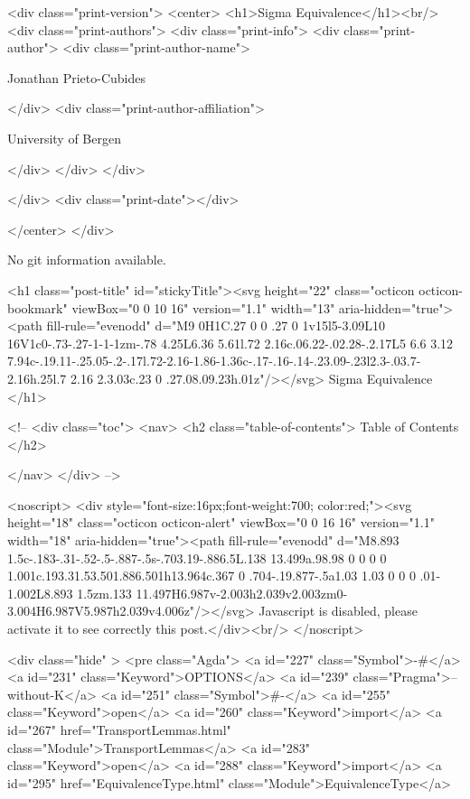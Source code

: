   <div class="print-version">
    <center>
      <h1>Sigma Equivalence</h1><br/>
        <div class="print-authors">
          <div class="print-info">
            <div class="print-author">
              <div class="print-author-name">
                
                  Jonathan Prieto-Cubides
                
              </div>
              <div class="print-author-affiliation">
                
                  University of Bergen
                
                </div>
            </div>
          </div>
          
          
        </div>
        <div class="print-date"></div>
        
        
    </center>
  </div>

  
  No git information available.
  
  <h1 class="post-title" id="stickyTitle"><svg height="22" class="octicon octicon-bookmark" viewBox="0 0 10 16" version="1.1" width="13" aria-hidden="true"><path fill-rule="evenodd" d="M9 0H1C.27 0 0 .27 0 1v15l5-3.09L10 16V1c0-.73-.27-1-1-1zm-.78 4.25L6.36 5.61l.72 2.16c.06.22-.02.28-.2.17L5 6.6 3.12 7.94c-.19.11-.25.05-.2-.17l.72-2.16-1.86-1.36c-.17-.16-.14-.23.09-.23l2.3-.03.7-2.16h.25l.7 2.16 2.3.03c.23 0 .27.08.09.23h.01z"/></svg> Sigma Equivalence
  </h1>

  <!-- 
  <div class="toc">
    <nav>
    <h2 class="table-of-contents"> Table of Contents </h2>
      

    </nav>
  </div>
   -->

  <noscript>
  <div style="font-size:16px;font-weight:700; color:red;"><svg height="18" class="octicon octicon-alert" viewBox="0 0 16 16" version="1.1" width="18" aria-hidden="true"><path fill-rule="evenodd" d="M8.893 1.5c-.183-.31-.52-.5-.887-.5s-.703.19-.886.5L.138 13.499a.98.98 0 0 0 0 1.001c.193.31.53.501.886.501h13.964c.367 0 .704-.19.877-.5a1.03 1.03 0 0 0 .01-1.002L8.893 1.5zm.133 11.497H6.987v-2.003h2.039v2.003zm0-3.004H6.987V5.987h2.039v4.006z"/></svg> Javascript is disabled, please activate it to see correctly this post.</div><br/>
  </noscript>

  <div class="hide" >
<pre class="Agda">
<a id="227" class="Symbol">{-#</a> <a id="231" class="Keyword">OPTIONS</a> <a id="239" class="Pragma">--without-K</a> <a id="251" class="Symbol">#-}</a>
<a id="255" class="Keyword">open</a> <a id="260" class="Keyword">import</a> <a id="267" href="TransportLemmas.html" class="Module">TransportLemmas</a>
<a id="283" class="Keyword">open</a> <a id="288" class="Keyword">import</a> <a id="295" href="EquivalenceType.html" class="Module">EquivalenceType</a>

